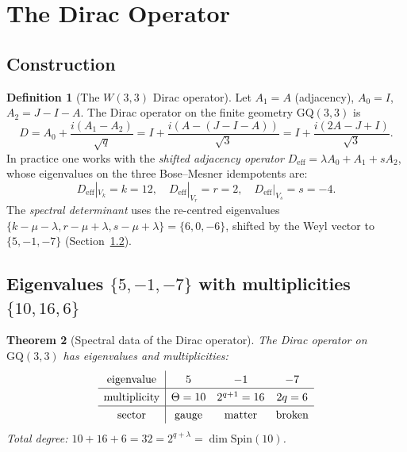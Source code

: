 \documentclass[12pt,a4paper]{article}
\newtheorem{theorem}{Theorem}[section]
\theoremstyle{definition}
\newtheorem{definition}[theorem]{Definition}
\newcommand{\GQ}{\mathrm{GQ}}
\begin{document}
\section{The Dirac Operator}
\label{sec:dirac}

\subsection{Construction}

\begin{definition}[The $W(3,3)$ Dirac operator]
\label{def:dirac}
Let $A_1=A$ (adjacency), $A_0=I$, $A_2=J-I-A$.
The Dirac operator on the finite geometry $\GQ(3,3)$ is
\begin{equation}
  \label{eq:DH}
  \boxed{D = A_0 + \frac{i(A_1-A_2)}{\sqrt{q}}
       = I + \frac{i(A-(J-I-A))}{\sqrt{3}}
       = I + \frac{i(2A-J+I)}{\sqrt{3}}.}
\end{equation}
In practice one works with the \emph{shifted adjacency operator}
$D_{\mathrm{eff}} = \lambda A_0 + A_1 + sA_2$, whose eigenvalues
on the three Bose--Mesner idempotents are:
\begin{equation}
  D_{\mathrm{eff}}|_{V_k} = k = 12,\quad
  D_{\mathrm{eff}}|_{V_r} = r = 2,\quad
  D_{\mathrm{eff}}|_{V_s} = s = -4.
\end{equation}
The \emph{spectral determinant} uses the re-centred eigenvalues
$\{k-\mu-\lambda, r-\mu+\lambda, s-\mu+\lambda\} = \{6,0,-6\}$,
shifted by the Weyl vector to $\{5,-1,-7\}$ (Section~\ref{ssec:eigs}).
\end{definition}

\subsection{Eigenvalues \texorpdfstring{$\{5,-1,-7\}$}{5,-1,-7} with multiplicities \texorpdfstring{$\{10,16,6\}$}{10,16,6}}
\label{ssec:eigs}

\begin{theorem}[Spectral data of the Dirac operator]
\label{thm:dirac_spec}
The Dirac operator on $\GQ(3,3)$ has eigenvalues and multiplicities:
\begin{equation}
  \label{eq:dirac_eigs}
  \renewcommand{\arraystretch}{1.3}
  \begin{array}{c|ccc}
  \text{eigenvalue} & 5 & -1 & -7 \\
  \hline
  \text{multiplicity} & \Theta=10 & 2^{q+1}=16 & 2q=6 \\
  \hline
  \text{sector} & \text{gauge} & \text{matter} & \text{broken}
  \end{array}
\end{equation}
Total degree: $10+16+6=32=2^{q+\lambda}=\dim\mathrm{Spin}(10)$.
\end{theorem}
\end{document}
